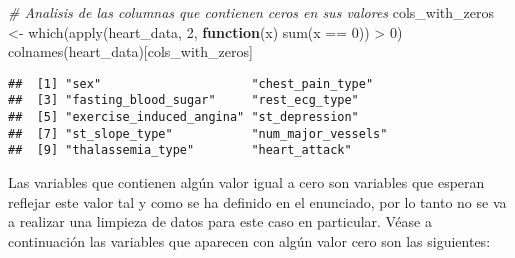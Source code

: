 \documentclass[
]{article}
\newenvironment{Shaded}{\begin{snugshade}}{\end{snugshade}}
\newcommand{\CommentTok}[1]{\textcolor[rgb]{0.56,0.35,0.01}{\textit{#1}}}
\newcommand{\ControlFlowTok}[1]{\textcolor[rgb]{0.13,0.29,0.53}{\textbf{#1}}}
\newcommand{\DecValTok}[1]{\textcolor[rgb]{0.00,0.00,0.81}{#1}}
\newcommand{\FunctionTok}[1]{\textcolor[rgb]{0.00,0.00,0.00}{#1}}
\newcommand{\NormalTok}[1]{#1}
\newcommand{\OtherTok}[1]{\textcolor[rgb]{0.56,0.35,0.01}{#1}}
\newcommand{\SpecialCharTok}[1]{\textcolor[rgb]{0.00,0.00,0.00}{#1}}
\begin{document}
\begin{Shaded}
\begin{Highlighting}[]
\CommentTok{\# Analisis de las columnas que contienen ceros en sus valores}
\NormalTok{cols\_with\_zeros }\OtherTok{\textless{}{-}} \FunctionTok{which}\NormalTok{(}\FunctionTok{apply}\NormalTok{(heart\_data, }\DecValTok{2}\NormalTok{, }\ControlFlowTok{function}\NormalTok{(x) }\FunctionTok{sum}\NormalTok{(x }\SpecialCharTok{==} \DecValTok{0}\NormalTok{)) }\SpecialCharTok{\textgreater{}} \DecValTok{0}\NormalTok{)}
\FunctionTok{colnames}\NormalTok{(heart\_data)[cols\_with\_zeros]}
\end{Highlighting}
\end{Shaded}

\begin{verbatim}
##  [1] "sex"                     "chest_pain_type"        
##  [3] "fasting_blood_sugar"     "rest_ecg_type"          
##  [5] "exercise_induced_angina" "st_depression"          
##  [7] "st_slope_type"           "num_major_vessels"      
##  [9] "thalassemia_type"        "heart_attack"
\end{verbatim}

Las variables que contienen algún valor igual a cero son variables que
esperan reflejar este valor tal y como se ha definido en el enunciado,
por lo tanto no se va a realizar una limpieza de datos para este caso en
particular. Véase a continuación las variables que aparecen con algún
valor cero son las siguientes:
\end{document}
